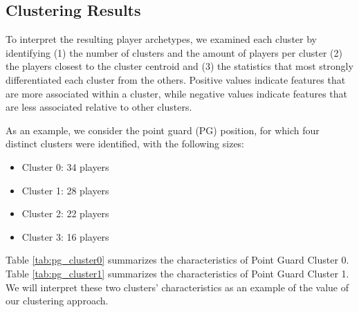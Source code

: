 \documentclass{article}
\begin{document}
\subsection{Clustering Results}
To interpret the resulting player archetypes, we examined each cluster by identifying 
(1) the number of clusters and the amount of players per cluster 
(2) the players closest to the cluster centroid and 
(3) the statistics that most strongly differentiated each cluster from the others. 
Positive values indicate features that are more associated within a cluster, 
while negative values indicate features that are less associated relative to 
other clusters. 

As an example, we consider the point guard (PG) position, for which four 
distinct clusters were identified, with the following sizes:
\begin{itemize}
    \item Cluster 0: 34 players
    \item Cluster 1: 28 players
    \item Cluster 2: 22 players
    \item Cluster 3: 16 players
\end{itemize}

Table \ref{tab:pg_cluster0} summarizes the characteristics of Point Guard Cluster 0. Table \ref{tab:pg_cluster1}
summarizes the characteristics of Point Guard Cluster 1.
We will interpret these two clusters' characteristics as an example of the value of our 
clustering approach. 
\end{document}

